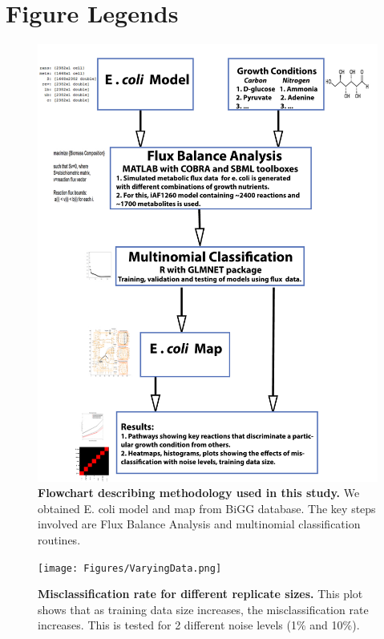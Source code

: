 \documentclass[12pt]{article}
\begin{document}
\section*{Figure Legends}
\begin{figure}[!ht]
\begin{center}
\includegraphics[width=4.5in]{Figures/flowchart_new.pdf}
\end{center}
\caption{
{\bf Flowchart describing methodology used in this study.} We obtained E. coli model and map from BiGG database. The key steps involved are Flux Balance Analysis and multinomial classification routines.
}
\label{Figure_label}
\end{figure}

\begin{figure}[!ht]
\begin{center}
\texttt{[image: Figures/VaryingData.png]}
\end{center}
\caption{
{\bf Misclassification rate for different replicate sizes.} This plot shows that as training data size increases, the misclassification rate increases. This is tested for 2 different noise levels (1\% and 10\%). 
}
\label{Figure_label}
\end{figure}
\end{document}
